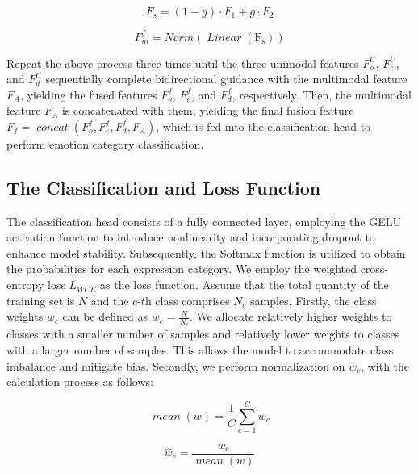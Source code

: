 \documentclass[lettersize,journal]{IEEEtran}
\begin{document}
\begin{equation}
\label{eq_12}
F_s = (1 - g) \cdot F_1 + g \cdot F_2
\end{equation}

\begin{equation}
\label{eq_13}
F_m^{f} = \operatorname{\mathit{Norm}\!\left(\operatorname{\mathit{Linear}}\!\left(F_s\right)\right)}
\end{equation}

Repeat the above process three times until the three unimodal features $F_{o}^{U}$, $F_{e}^{U}$, and $F_{d}^{U}$ sequentially complete bidirectional guidance with the multimodal feature $F_A$, yielding the fused features $F_{o}^{f}$, $F_{e}^{f}$, and $F_{d}^{f}$, respectively. Then, the multimodal feature $F_A$ is concatenated with them, yielding the final fusion feature $F_f = \operatorname{\mathit{concat}}\!\left(F_{o}^{f},F_{e}^{f},F_{d}^{f}, F_A\right)$, which is fed into the classification head to perform emotion category classification.

\subsection{The Classification and Loss Function}

The classification head consists of a fully connected layer, employing the GELU activation function to introduce nonlinearity and incorporating dropout to enhance model stability. Subsequently, the Softmax function is utilized to obtain the probabilities for each expression category. We employ the weighted cross-entropy loss $L_{\mathit{WCE}}$ as the loss function. Assume that the total quantity of the training set is $N$ and the $\mathit{c\text{-th}}$ class comprises $N_c$ samples. Firstly, the class weights $w_c$ can be defined as $w_c = \frac{N}{N_c}$. We allocate relatively higher weights to classes with a smaller number of samples and relatively lower weights to classes with a larger number of samples. This allows the model to accommodate class imbalance and mitigate bias. Secondly, we perform normalization on $w_c$, with the calculation process as follows:

\begin{equation}
\label{eq_14}
\operatorname{\mathit{mean}}(w) = \frac{1}{C}\sum_{c=1}^{C} w_c
\end{equation}

\begin{equation}
\label{eq_15}
\hat{w}_c = \frac{w_c}{\operatorname{\mathit{mean}}(w)}
\end{equation}
\end{document}
